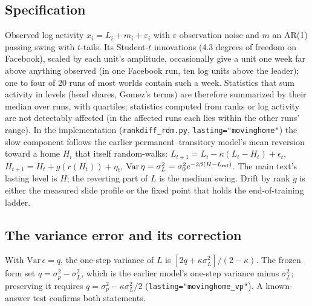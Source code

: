 \documentclass[10pt]{article}
\begin{document}
\subsection{Specification}
Observed log activity $x_i = L_i + m_i + \varepsilon_i$ with $\varepsilon$ observation noise and $m$ an AR(1) passing swing with $t$-tails. Its Student-$t$ innovations (4.3 degrees of freedom on Facebook), scaled by each unit's amplitude, occasionally give a unit one week far above anything observed (in one Facebook run, ten log units above the leader); one to four of 20 runs of most worlds contain such a week. Statistics that sum activity in levels (head shares, Gomez's terms) are therefore summarized by their median over runs, with quartiles; statistics computed from ranks or log activity are not detectably affected (in the affected runs each lies within the other runs' range). In the implementation (\texttt{rankdiff\_rdm.py}, \texttt{lasting="movinghome"}) the slow component follows the earlier permanent--transitory model's mean reversion toward a home $H_i$ that itself random-walks: $L_{t+1} = L_t - \kappa(L_t-H_t) + \epsilon_t$, $H_{t+1} = H_t + g(r(H_t)) + \eta_t$, $\mathrm{Var}\,\eta = \sigma_L^2 = \sigma_0^2 e^{-2\beta(H-L_{\rm ref})}$. The main text's lasting level is $H$; the reverting part of $L$ is the medium swing. Drift by rank $g$ is either the measured slide profile or the fixed point that holds the end-of-training ladder.
\subsection{The variance error and its correction}
With $\mathrm{Var}\,\epsilon = q$, the one-step variance of $L$ is $[2q+\kappa\sigma_L^2]/(2-\kappa)$. The frozen form set $q = \sigma_p^2-\sigma_L^2$, which is the earlier model's one-step variance minus $\sigma_L^2$; preserving it requires $q=\sigma_p^2-\kappa\sigma_L^2/2$ (\texttt{lasting="movinghome\_vp"}). A known-answer test confirms both statements.
\end{document}
